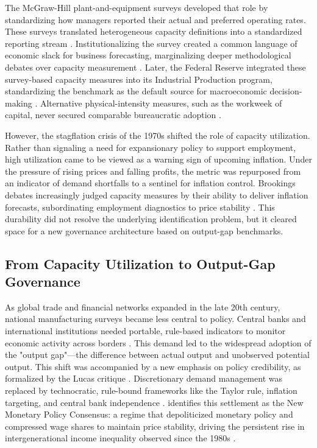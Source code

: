 \documentclass[11pt]{article}
\begin{document}
The McGraw-Hill plant-and-equipment surveys developed that role by standardizing how managers reported their actual and preferred operating rates. These surveys translated heterogeneous capacity definitions into a standardized reporting stream \citep{Butler1958, Phillips1963}. Institutionalizing the survey created a common language of economic slack for business forecasting, marginalizing deeper methodological debates over capacity measurement \citep{BaranSweezy1988, Munroe2007}. Later, the Federal Reserve integrated these survey-based capacity measures into its Industrial Production program, standardizing the benchmark as the default source for macroeconomic decision-making \citep{Board2017}. Alternative physical-intensity measures, such as the workweek of capital, never secured comparable bureaucratic adoption \citep{Foss1963, TaubmanGottschalk1971}.

However, the stagflation crisis of the 1970s shifted the role of capacity utilization. Rather than signaling a need for expansionary policy to support employment, high utilization came to be viewed as a warning sign of upcoming inflation. Under the pressure of rising prices and falling profits, the metric was repurposed from an indicator of demand shortfalls to a sentinel for inflation control. Brookings debates increasingly judged capacity measures by their ability to deliver inflation forecasts, subordinating employment diagnostics to price stability \citep{KleinEtAl1973}. This durability did not resolve the underlying identification problem, but it cleared space for a new governance architecture based on output-gap benchmarks.

\subsection{From Capacity Utilization to Output-Gap Governance}
\label{subsec:output_gap_governance}

As global trade and financial networks expanded in the late 20th century, national manufacturing surveys became less central to policy. Central banks and international institutions needed portable, rule-based indicators to monitor economic activity across borders \citep{Jessop2002, Jessop2003, Konings2007}. This demand led to the widespread adoption of the "output gap"—the difference between actual output and unobserved potential output. This shift was accompanied by a new emphasis on policy credibility, as formalized by the Lucas critique \citep{Johnson2024}. Discretionary demand management was replaced by technocratic, rule-bound frameworks like the Taylor rule, inflation targeting, and central bank independence \citep{Taylor1993, Johnson2024}. \citet{SaadFilho2018} identifies this settlement as the New Monetary Policy Consensus: a regime that depoliticized monetary policy and compressed wage shares to maintain price stability, driving the persistent rise in intergenerational income inequality observed since the 1980s \citep{HickelEtAl2026, Foster2024}.
\end{document}

